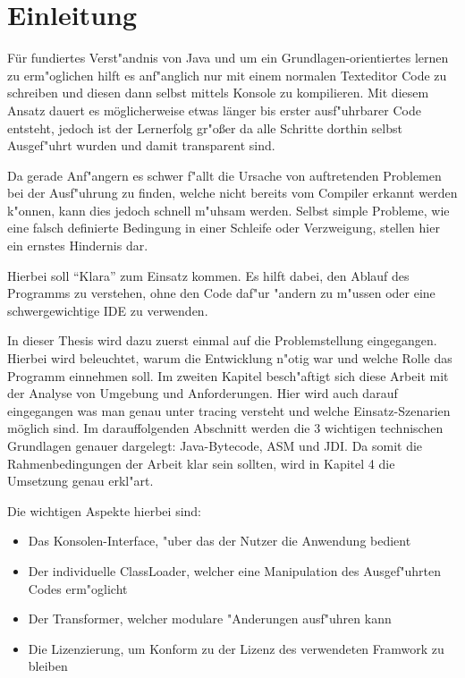 
\chapter{Einleitung}

Für fundiertes Verst"andnis von Java und um ein Grundlagen-orientiertes lernen zu erm"oglichen hilft es anf"anglich nur mit einem normalen Texteditor Code zu schreiben und diesen dann selbst mittels Konsole zu kompilieren.
Mit diesem Ansatz dauert es möglicherweise etwas länger bis erster ausf"uhrbarer Code entsteht, jedoch ist der Lernerfolg gr"o\ss{}er da alle Schritte dorthin selbst Ausgef"uhrt wurden und damit transparent sind.

Da gerade Anf"angern es schwer f"allt die Ursache von auftretenden Problemen bei der Ausf"uhrung zu finden, welche nicht bereits vom Compiler erkannt werden k"onnen, kann dies jedoch schnell m"uhsam werden. Selbst simple Probleme, wie eine falsch definierte Bedingung in einer Schleife oder Verzweigung, stellen hier ein ernstes Hindernis dar.

Hierbei soll "`Klara"' zum Einsatz kommen. Es hilft dabei, den Ablauf des Programms zu verstehen, ohne den Code daf"ur "andern zu m"ussen oder eine schwergewichtige \ac{IDE} zu verwenden.

In dieser Thesis wird dazu zuerst einmal auf die Problemstellung eingegangen. Hierbei wird beleuchtet, warum die Entwicklung n"otig war und welche Rolle das Programm einnehmen soll.
Im zweiten Kapitel besch"aftigt sich diese Arbeit mit der Analyse von Umgebung und Anforderungen. Hier wird auch darauf eingegangen was man genau unter tracing versteht und welche Einsatz-Szenarien möglich sind.
Im darauffolgenden Abschnitt werden die 3 wichtigen technischen Grundlagen genauer dargelegt: Java-Bytecode, ASM und \ac{JDI}.
Da somit die Rahmenbedingungen der Arbeit klar sein sollten, wird in Kapitel 4 die Umsetzung genau erkl"art.

Die wichtigen Aspekte hierbei sind:
\begin{itemize}
	\item Das Konsolen-Interface, "uber das der Nutzer die Anwendung bedient
	\item Der individuelle ClassLoader, welcher eine Manipulation des Ausgef"uhrten Codes erm"oglicht
	\item Der Transformer, welcher modulare "Anderungen ausf"uhren kann
	\item Die Lizenzierung, um Konform zu der Lizenz des verwendeten Framwork zu bleiben
\end{itemize}

